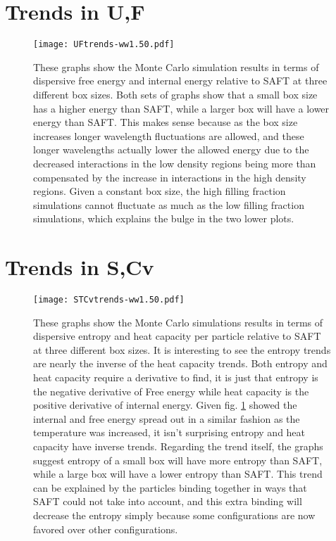 \section{Trends in U,F}
\begin{figure}[h]
\vspace*{-10mm}
\hspace*{-6mm}
	\centering
	\texttt{[image: UFtrends-ww1.50.pdf]}
	\caption{
	\scriptsize
	These graphs show the Monte Carlo simulation results in terms of dispersive free energy and internal energy relative to SAFT at three different box sizes. Both sets of graphs show that a small box size has a higher energy than SAFT, while a larger box will have a lower energy than SAFT. This makes sense because as the box size increases longer wavelength fluctuations are allowed, and these longer wavelengths actually lower the allowed energy due to the decreased interactions in the low density regions being more than compensated by the increase in interactions in the high density regions. Given a constant box size, the high filling fraction simulations cannot fluctuate as much as the low filling fraction simulations, which explains the bulge in the two lower plots.}
	\label{fig:UFtrends}
\end{figure}


\pagebreak
\section{Trends in S,Cv}
\begin{figure}[h]
\vspace*{-40mm}
\hspace*{-6mm}
	\centering
	\texttt{[image: STCvtrends-ww1.50.pdf]}
	\caption{\scriptsize
	These graphs show the Monte Carlo simulations results in terms of dispersive entropy and heat capacity per particle relative to SAFT at three different box sizes. It is interesting to see the entropy trends are nearly the inverse of the heat capacity trends. Both entropy and heat capacity require a derivative to find, it is just that entropy is the negative derivative of Free energy while heat capacity is the positive derivative of internal energy. Given fig. \ref{fig:UFtrends} showed the internal and free energy spread out in a similar fashion as the temperature was increased, it isn't surprising entropy and heat capacity have inverse trends. Regarding the trend itself, the graphs suggest entropy of a small box will have more entropy than SAFT, while a large box will have a lower entropy than SAFT. This trend can be explained by the particles binding together in ways that SAFT could not take into account, and this extra binding will decrease the entropy simply because some configurations are now favored over other configurations.}
	\label{fig:STCvtrends}
\end{figure}


